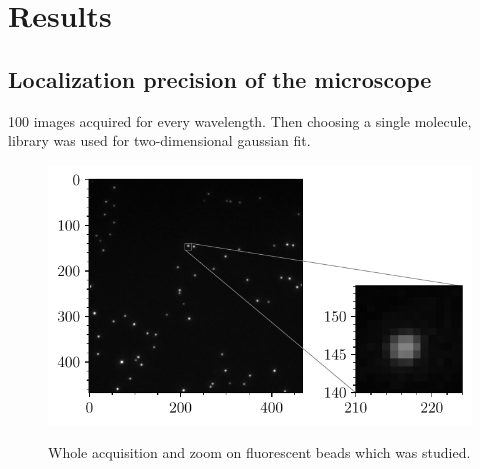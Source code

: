\section{Results}
\subsection{Localization precision of the microscope}
100 images acquired for every wavelength.
Then choosing a single molecule,  library was used for two-dimensional gaussian fit.

\begin{figure}[htbp]
    \centering
    \includegraphics[scale=1]{figures/beads_inset_zoom.pdf}
    \label{fig:beads_inset_zoom}
    \caption{Whole acquisition and zoom on fluorescent beads which was studied.}
\end{figure}


